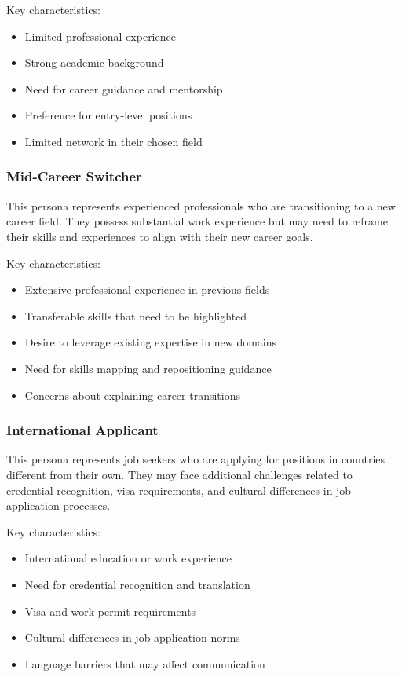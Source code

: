 \documentclass[12pt,a4paper]{report}
\begin{document}
Key characteristics:
\begin{itemize}[leftmargin=2em]
  \item Limited professional experience
  \item Strong academic background
  \item Need for career guidance and mentorship
  \item Preference for entry-level positions
  \item Limited network in their chosen field
\end{itemize}

\subsubsection{Mid-Career Switcher}
This persona represents experienced professionals who are transitioning to a new career field. They possess substantial work experience but may need to reframe their skills and experiences to align with their new career goals.

Key characteristics:
\begin{itemize}[leftmargin=2em]
  \item Extensive professional experience in previous fields
  \item Transferable skills that need to be highlighted
  \item Desire to leverage existing expertise in new domains
  \item Need for skills mapping and repositioning guidance
  \item Concerns about explaining career transitions
\end{itemize}

\subsubsection{International Applicant}
This persona represents job seekers who are applying for positions in countries different from their own. They may face additional challenges related to credential recognition, visa requirements, and cultural differences in job application processes.

Key characteristics:
\begin{itemize}[leftmargin=2em]
  \item International education or work experience
  \item Need for credential recognition and translation
  \item Visa and work permit requirements
  \item Cultural differences in job application norms
  \item Language barriers that may affect communication
\end{itemize}
\end{document}
